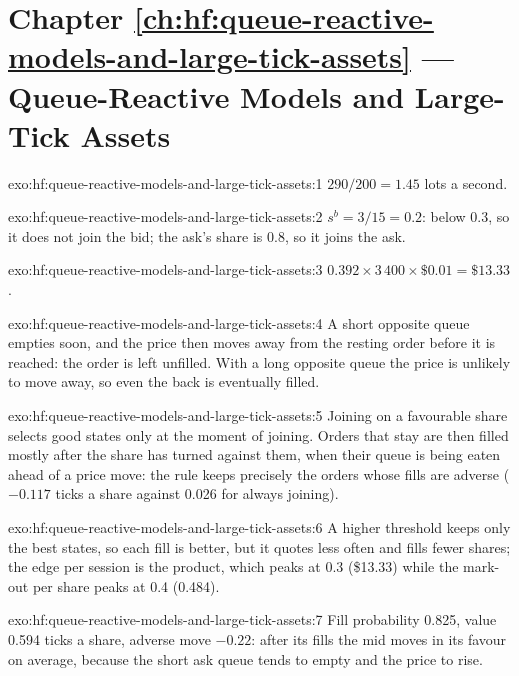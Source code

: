 \section*{Chapter \ref{ch:hf:queue-reactive-models-and-large-tick-assets} --- Queue-Reactive Models and Large-Tick Assets}

\begin{solution}{exo:hf:queue-reactive-models-and-large-tick-assets:1}
$290/200=1.45$ lots a second.
\end{solution}

\begin{solution}{exo:hf:queue-reactive-models-and-large-tick-assets:2}
$s^b=3/15=0.2$: below 0.3, so it does not join the bid; the ask's share is 0.8, so it joins the ask.
\end{solution}

\begin{solution}{exo:hf:queue-reactive-models-and-large-tick-assets:3}
$0.392\times3\,400\times\$0.01=\$13.33$.
\end{solution}

\begin{solution}{exo:hf:queue-reactive-models-and-large-tick-assets:4}
A short opposite queue empties soon, and the price then moves away from the resting order before it is reached: the order is left unfilled.
With a long opposite queue the price is unlikely to move away, so even the back is eventually filled.
\end{solution}

\begin{solution}{exo:hf:queue-reactive-models-and-large-tick-assets:5}
Joining on a favourable share selects good states only at the moment of joining. Orders that stay are then filled mostly after the share has
turned against them, when their queue is being eaten ahead of a price move: the rule keeps precisely the orders whose fills are adverse
($-0.117$ ticks a share against 0.026 for always joining).
\end{solution}

\begin{solution}{exo:hf:queue-reactive-models-and-large-tick-assets:6}
A higher threshold keeps only the best states, so each fill is better, but it quotes less often and fills fewer shares; the edge per session is
the product, which peaks at 0.3 (\$13.33) while the mark-out per share peaks at 0.4 (0.484).
\end{solution}

\begin{solution}{exo:hf:queue-reactive-models-and-large-tick-assets:7}
Fill probability 0.825, value 0.594 ticks a share, adverse move $-0.22$: after its fills the mid moves in its favour on average, because the
short ask queue tends to empty and the price to rise.
\end{solution}

